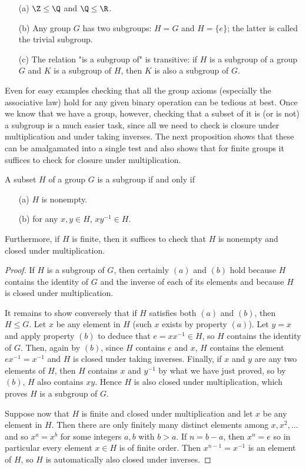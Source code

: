 \begin{example}
\mbox{}
\begin{itemize}
\item[(a)] $\Z\leq\Q$ and $\Q\leq\R$.
\item[(b)] Any group $G$ has two subgroups: $H=G$ and $H=\{e\}$; the latter is called the trivial subgroup.
\item[(c)] The relation "is a subgroup of" is transitive: if $H$ is a subgroup of a group $G$ and $K$ is a subgroup of $H$, then $K$ is also a subgroup of $G$. 
\end{itemize}
\end{example}
Even for easy examples checking that all the group axioms (especially the associative law) hold for any given binary operation can be tedious at best. Once we know that we have a group, however, checking that a subset of it is (or is not) a subgroup is a much easier task, since all we need to check is closure under multiplication and under taking inverses. The next proposition shows that these can be amalgamated into a single test and also shows that for finite groups it suffices to check for closure under multiplication.
\begin{proposition}
A subset $H$ of a group $G$ is a subgroup if and only if
\begin{itemize}
\item[(a)] $H$ is nonempty.
\item[(b)] for any $x,y\in H$, $xy^{-1}\in H$. 
\end{itemize}
Furthermore, if $H$ is finite, then it suffices to check that $H$ is nonempty and closed under multiplication.
\end{proposition}
\begin{proof}
If $H$ is a subgroup of $G$, then certainly $(a)$ and $(b)$ hold because $H$ contains the identity of $G$ and the inverse of each of its elements and because $H$ is closed under multiplication.\par
It remains to show conversely that if $H$ satisfies both $(a)$ and $(b)$, then $H\leq G$. Let $x$ be any element in $H$ (such $x$ exists by property $(a)$). Let $y=x$ and apply property $(b)$ to deduce that $e=xx^{-1}\in H$, so $H$ contains the identity of $G$. Then, again by $(b)$, since $H$ contains $e$ and $x$, $H$ contains the element $ex^{-1}=x^{-1}$ and $H$ is closed under taking inverses. Finally, if $x$ and $y$ are any two elements of $H$, then $H$ contains $x$ and $y^{-1}$ by what we have just proved, so by $(b)$, $H$ also contains $xy$. Hence $H$ is also closed under multiplication, which proves $H$ is a subgroup of $G$.\par
Suppose now that $H$ is finite and closed under multiplication and let $x$ be any element in $H$. Then there are only finitely many distinct elements among $x,x^2,\dots$ and so $x^a=x^b$ for some integers $a,b$ with $b>a$. If $n=b-a$, then $x^n=e$ so in particular every element $x\in H$ is of finite order. Then $x^{n-1}=x^{-1}$ is an element of $H$, so $H$ is automatically also closed under inverses.
\end{proof}
